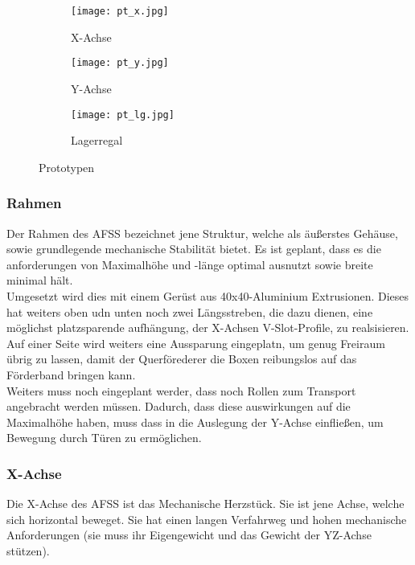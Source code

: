 \begin{figure}[H]
    \centering
    \begin{subfigure}{.3\textwidth}
        \centering
        \texttt{[image: pt\_x.jpg]}
        \caption{X-Achse}
        \label{pts:plt_x}
    \end{subfigure}%
    \begin{subfigure}{.3\textwidth}
        \centering
        \texttt{[image: pt\_y.jpg]}
        \caption{Y-Achse}
        \label{pts:plt_y}
    \end{subfigure}%
    \begin{subfigure}{.3\textwidth}
        \centering
        \texttt{[image: pt\_lg.jpg]}
        \caption{Lagerregal}
        \label{pts:plt_ls}
    \end{subfigure}
    \caption{Prototypen}
    \label{pts}
\end{figure}


\subsubsection{Rahmen}

Der Rahmen des AFSS bezeichnet jene Struktur, welche als äußerstes Gehäuse, sowie grundlegende mechanische Stabilität bietet. Es ist geplant, dass es die anforderungen von Maximalhöhe und -länge optimal ausnutzt sowie breite minimal hält. \\
Umgesetzt wird dies mit einem Gerüst aus 40x40-Aluminium Extrusionen. Dieses hat weiters oben udn unten noch zwei Längsstreben, die dazu dienen, eine möglichst platzsparende aufhängung, der X-Achsen V-Slot-Profile, zu realsisieren. Auf einer Seite wird weiters eine Aussparung eingeplatn, um genug Freiraum übrig zu lassen, damit der Querförederer die Boxen reibungslos auf das Förderband bringen kann.\\
Weiters muss noch eingeplant werder, dass noch Rollen zum Transport angebracht werden müssen. Dadurch, dass diese auswirkungen auf die Maximalhöhe haben, muss dass in die Auslegung der Y-Achse einfließen, um Bewegung durch Türen zu ermöglichen.

\subsubsection{X-Achse}
Die X-Achse des AFSS ist das Mechanische Herzstück. Sie ist jene Achse, welche sich horizontal beweget. Sie hat einen langen Verfahrweg und hohen mechanische Anforderungen (sie muss ihr Eigengewicht und das Gewicht der YZ-Achse stützen). 

